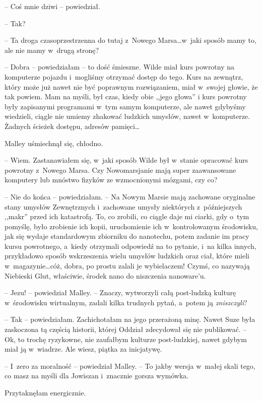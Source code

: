 \documentclass[oneside,polish,11pt,sfheadings]{mwbk}
\begin{document}
-- Coś mnie dziwi -- powiedział.

-- Tak?

-- Ta droga czasoprzestrzenna do tutaj z~Nowego Marsa\ldots  w~jaki sposób
mamy to, ale nie mamy w~drugą stronę?

-- Dobra -- powiedziałam -- to dość śmieszne. Wilde miał kurs powrotny na
komputerze pojazdu i~mogliśmy otrzymać dostęp do tego. Kurs na zewnątrz,
który może już nawet nie być poprawnym rozwiązaniem, miał w~swojej
głowie, że tak powiem. Mam na myśli, był czas, kiedy obie ,,jego głowa''
i kurs powrotny były zapisanymi programami w~tym samym komputerze, ale
nawet gdybyśmy wiedzieli, ciągle nie umiemy zhakować ludzkich umysłów,
nawet w~komputerze. Żadnych ścieżek dostępu, adresów pamięci\ldots 

Malley uśmiechnął się, chłodno. 

-- Wiem. Zastanawiałem się, w~jaki
sposób Wilde był w~stanie opracować kurs powrotny z~Nowego Marsa. Czy
Nowomarsjanie mają super zaawansowane komputery lub mnóstwo fizyków ze
wzmocnionymi mózgami, czy co?

-- Nie do końca -- powiedziałam. -- Na Nowym Marsie mają zachowane
oryginalne stany umysłów Zewnętrznych i~zachowane umysły niektórych z~późniejszych ,,makr'' przed ich katastrofą. To, co zrobili, co ciągle
daje mi ciarki, gdy o~tym pomyślę, było zrobienie ich kopii,
uruchomienie ich w~kontrolowanym środowisku, jak się wydaje standardowym
zbiorniku do nanotechu, potem zadanie im pracy kursu powrotnego, a~kiedy
otrzymali odpowiedź na to pytanie, i~na kilka innych, przykładowo sposób
wskrzeszenia wielu umysłów ludzkich oraz ciał, które mieli w~magazynie\ldots  cóż, dobra, po prostu zalali je wybielaczem! Czymś, co
nazywają Niebieski Glut, właściwie, środek nano do niszczenia
nanoware'u.

-- Jezu! -- powiedział Malley. -- Znaczy, wytworzyli całą post-ludzką
kulturę w~środowisku wirtualnym, zadali kilka trudnych pytań, a~potem ją
\textit{zniszczyli}?

-- Tak -- powiedziałam. Zachichotałam na jego przerażoną minę. Nawet Suze
była zaskoczona tą częścią historii, której Oddział zdecydował się nie
publikować. -- Ok, to trochę ryzykowne, nie zaufałbym kulturze
post-ludzkiej, nawet gdybym miał ją w~wiadrze. Ale wiesz, piątka za
inicjatywę.

-- I~zero za moralność -- powiedział Malley. -- To jakby wersja w~małej
skali tego, co masz na myśli dla Jowiszan i~znacznie gorsza wymówka.

Przytaknęłam energicznie. 
\end{document}
